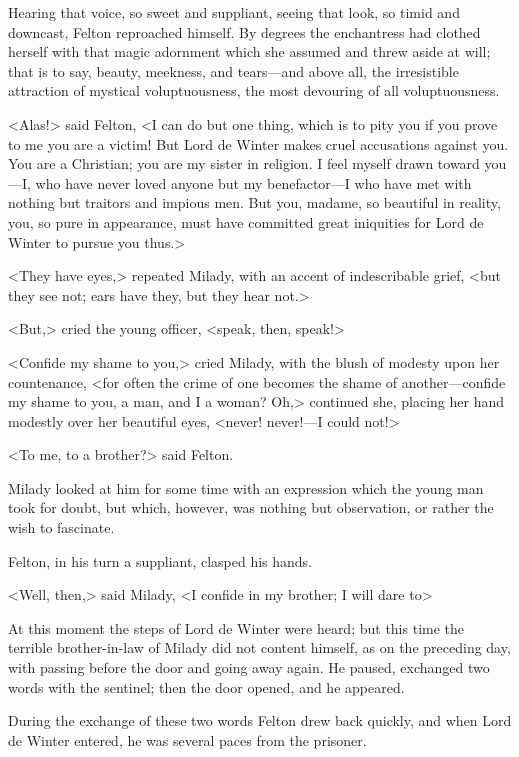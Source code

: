 Hearing that voice, so sweet and suppliant, seeing that look, so timid and downcast, Felton reproached himself. By degrees the enchantress had clothed herself with that magic adornment which she assumed and threw aside at will; that is to say, beauty, meekness, and tears---and above all, the irresistible attraction of mystical voluptuousness, the most devouring of all voluptuousness. 

<Alas!> said Felton, <I can do but one thing, which is to pity you if you prove to me you are a victim! But Lord de Winter makes cruel accusations against you. You are a Christian; you are my sister in religion. I feel myself drawn toward you---I, who have never loved anyone but my benefactor---I who have met with nothing but traitors and impious men. But you, madame, so beautiful in reality, you, so pure in appearance, must have committed great iniquities for Lord de Winter to pursue you thus.> 

<They have eyes,> repeated Milady, with an accent of indescribable grief, <but they see not; ears have they, but they hear not.> 

<But,> cried the young officer, <speak, then, speak!> 

<Confide my shame to you,> cried Milady, with the blush of modesty upon her countenance, <for often the crime of one becomes the shame of another---confide my shame to you, a man, and I a woman? Oh,> continued she, placing her hand modestly over her beautiful eyes, <never! never!---I could not!> 

<To me, to a brother?> said Felton. 

Milady looked at him for some time with an expression which the young man took for doubt, but which, however, was nothing but observation, or rather the wish to fascinate. 

Felton, in his turn a suppliant, clasped his hands. 

<Well, then,> said Milady, <I confide in my brother; I will dare to\longdash> 

At this moment the steps of Lord de Winter were heard; but this time the terrible brother-in-law of Milady did not content himself, as on the preceding day, with passing before the door and going away again. He paused, exchanged two words with the sentinel; then the door opened, and he appeared. 

During the exchange of these two words Felton drew back quickly, and when Lord de Winter entered, he was several paces from the prisoner. 

